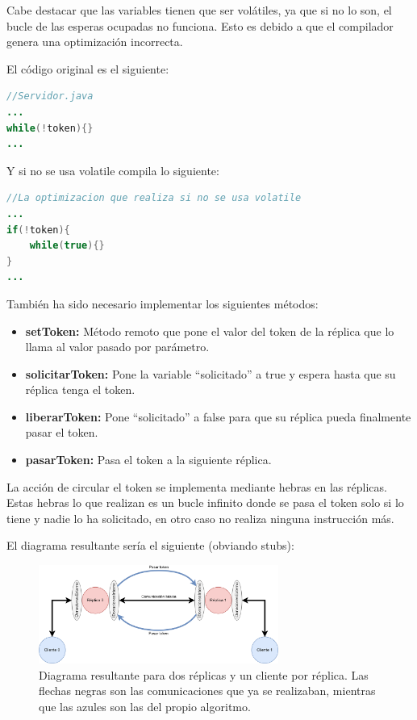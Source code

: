 \documentclass{article}
\begin{document}
Cabe destacar que las variables tienen que ser volátiles, ya que si no lo son, el bucle de las esperas ocupadas no funciona. Esto es debido a que el compilador genera una optimización incorrecta.

\newpage

El código original es el siguiente:

\begin{lstlisting}[language=Java]
//Servidor.java
...
while(!token){}
...
\end{lstlisting}

Y si no se usa volatile compila lo siguiente:

\begin{lstlisting}[language=Java]
//La optimizacion que realiza si no se usa volatile
...
if(!token){
    while(true){}
}
...
\end{lstlisting} 

\bigskip

También ha sido necesario implementar los siguientes métodos:

\begin{itemize}
    \item \textbf{setToken: }Método remoto que pone el valor del token de la réplica que lo llama al valor pasado por parámetro.
    \item \textbf{solicitarToken: }Pone la variable ``solicitado'' a true y espera hasta que su réplica tenga el token.
    \item \textbf{liberarToken: }Pone ``solicitado'' a false para que su réplica pueda finalmente pasar el token.
    \item \textbf{pasarToken: }Pasa el token a la siguiente réplica.
\end{itemize}

La acción de circular el token se implementa mediante hebras en las réplicas. Estas hebras lo que realizan es un bucle infinito donde se pasa el token solo si lo tiene y nadie lo ha solicitado, en otro caso no realiza ninguna instrucción más.

\bigskip

El diagrama resultante sería el siguiente (obviando stubs):

\begin{figure}[H]
    \centering
    \includegraphics[width=0.7\textwidth]{imagenes/diagramaAnillo.png}
    \caption{Diagrama resultante para dos réplicas y un cliente por réplica. Las flechas negras son las comunicaciones que ya se realizaban, mientras que las azules son las del propio algoritmo.}
\end{figure}
\end{document}
